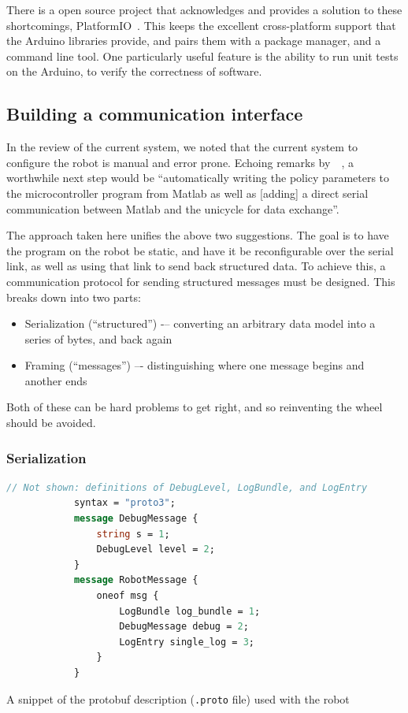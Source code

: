 \documentclass[main.tex]{subfiles}
\begin{document}
	There is a open source project that acknowledges and provides a solution to these shortcomings, PlatformIO~\cite{platformio}.
	This keeps the excellent cross-platform support that the Arduino libraries provide, and pairs them with a package manager, and a command line tool.
	One particularly useful feature is the ability to run unit tests on the Arduino, to verify the correctness of software.

\subsection{Building a communication interface}
	\label{sec:comms}

	In the review of the current system, we noted that the current system to configure the robot is manual and error prone.
	Echoing remarks by~\citeauthor{aleksi}~\cite[p.~34]{aleksi}, a worthwhile next step would be \enquote{automatically writing the policy parameters to the microcontroller program from Matlab as well as [adding] a direct serial communication between Matlab and the unicycle for data exchange}.

	The approach taken here unifies the above two suggestions.
	The goal is to have the program on the robot be static, and have it be reconfigurable over the serial link, as well as using that link to send back structured data.
	To achieve this, a communication protocol for sending structured messages must be designed. This breaks down into two parts:
	\begin{itemize}[noitemsep]
		\item Serialization (\enquote{structured}) -– converting an arbitrary data model into a series of bytes, and back again
		\item Framing (\enquote{messages}) –- distinguishing where one message begins and another ends
	\end{itemize}
	Both of these can be hard problems to get right, and so reinventing the wheel should be avoided.

	\subsubsection{Serialization}

		\begin{listingfloat}[t]
			\begin{lstlisting}[language=proto, gobble=6, frame=single]
			// Not shown: definitions of DebugLevel, LogBundle, and LogEntry
			syntax = "proto3";
			message DebugMessage {
				string s = 1;
				DebugLevel level = 2;
			}
			message RobotMessage {
				oneof msg {
					LogBundle log_bundle = 1;
					DebugMessage debug = 2;
					LogEntry single_log = 3;
				}
			}
			\end{lstlisting}
			\caption{A snippet of the protobuf description (\texttt{.proto} file) used with the robot}
			\label{lst:proto}
		\end{listingfloat}
\end{document}
